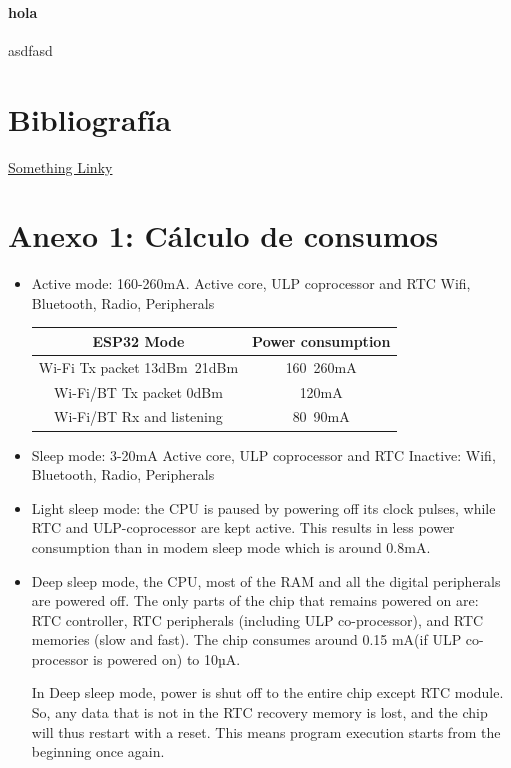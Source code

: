 \documentclass[a4paper ,12pt, onecolumn]{article}
\begin{document}
\paragraph{hola}
asdfasd



\section{Bibliografía}
\href{https://campus.masterd.es/campusvirtual/index.htm}{Something Linky} 


\section{Anexo 1: Cálculo de consumos}
\begin{itemize}
    \item  Active mode: 160-260mA.  Active core, ULP coprocessor and RTC
     Wifi, Bluetooth, Radio, Peripherals
    \begin{center}
        \begin{tabular}{||c | c ||} 
        \hline
        ESP32 Mode & Power consumption  \\ [0.5ex] 
        \hline\hline
        Wi-Fi Tx packet 13dBm~21dBm & 160~260mA  \\ 
        \hline
        Wi-Fi/BT Tx packet 0dBm	 & 120mA  \\
        \hline
        Wi-Fi/BT Rx and listening & 80~90mA  \\
        \hline
       \end{tabular}
       \end{center}
    \item  Sleep mode: 3-20mA Active core, ULP coprocessor and RTC
    Inactive: Wifi, Bluetooth, Radio, Peripherals
    \item  Light sleep mode: the CPU is paused by powering off its clock 
    pulses, while RTC and ULP-coprocessor are kept active. This results in 
    less power consumption than in modem sleep mode which is around 0.8mA.

    \item Deep sleep mode, the CPU, most of the RAM and all the digital 
    peripherals are powered off. The only parts of the chip that remains 
    powered on are: RTC controller, RTC peripherals (including ULP 
    co-processor), and RTC memories (slow and fast).
    The chip consumes around 0.15 mA(if ULP co-processor is powered on) to 10µA.

    In Deep sleep mode, power is shut off to the entire chip except RTC module. So, any data that is not in the RTC recovery memory is lost, and the chip will thus restart with a reset. This means program execution starts from the beginning once again.


\end{itemize}
\end{document}
